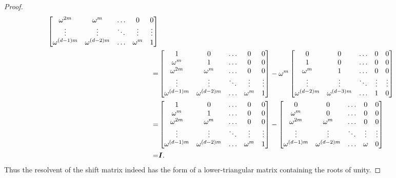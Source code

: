 \begin{proof}
\begin{align*}
\begin{bmatrix}
         \omega^{2m} & \omega^{m} & \dots & 0 & 0 \\
         \vdots & \vdots & \ddots & \vdots & \vdots \\
         \omega^{(d-1)m} & \omega^{(d-2)m} & \dots & \omega^m & 1 \\
       \end{bmatrix} \\
             =&   \begin{bmatrix}
             1 & 0 & \dots & 0 & 0 \\
             \omega^m & 1 & \dots & 0 & 0 \\
             \omega^{2m} & \omega^{m} & \dots & 0 & 0 \\
             \vdots & \vdots & \ddots & \vdots & \vdots \\
             \omega^{(d-1)m} & \omega^{(d-2)m} & \dots & \omega^m & 1 \\
           \end{bmatrix}
        - \omega^m
        \begin{bmatrix}
              0 & 0 & \dots & 0 & 0 \\
              1 & 0 & \dots & 0 & 0 \\
              \omega^{m} & 1 & \dots & 0 & 0 \\
              \vdots & \vdots & \ddots & \vdots & \vdots \\
              \omega^{(d-2)m} & \omega^{(d-3)m} & \dots & 1 & 0 \\
            \end{bmatrix} \\
                  =&   \begin{bmatrix}
             1 & 0 & \dots & 0 & 0 \\
             \omega^m & 1 & \dots & 0 & 0 \\
             \omega^{2m} & \omega^{m} & \dots & 0 & 0 \\
             \vdots & \vdots & \ddots & \vdots & \vdots \\
             \omega^{(d-1)m} & \omega^{(d-2)m} & \dots & \omega^m & 1 \\
           \end{bmatrix}
        -
        \begin{bmatrix}
          0 & 0 & \dots & 0 & 0 \\
          \omega^m & 0 & \dots & 0 & 0 \\
          \omega^{2m} & \omega^m & \dots & 0 & 0 \\
          \vdots & \vdots & \ddots & \vdots & \vdots \\
          \omega^{(d-1)m} & \omega^{(d-2)m} & \dots & \omega & 0 \\
        \end{bmatrix} \\
          =& \boldsymbol{I}.
\end{align*}
Thus the resolvent of the shift matrix indeed has the form of a lower-triangular
matrix containing the roots of unity.


\end{proof}
